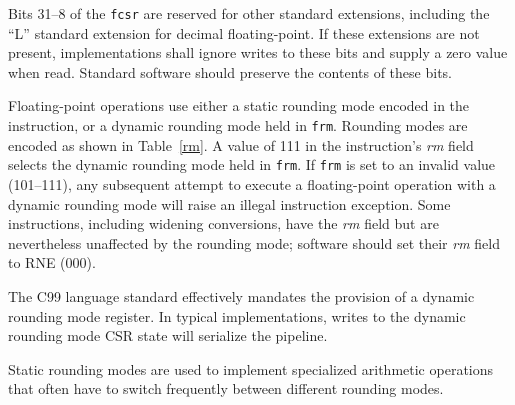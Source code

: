 Bits 31--8 of the {\tt fcsr} are reserved for other standard extensions,
including the ``L'' standard extension for decimal floating-point.  If
these extensions are not present, implementations shall ignore writes to
these bits and supply a zero value when read.  Standard software should
preserve the contents of these bits.

Floating-point operations use either a static rounding mode encoded in the
instruction, or a dynamic rounding mode held in {\tt frm}.  Rounding modes are
encoded as shown in Table~\ref{rm}.  A value of 111 in the instruction's {\em
rm} field selects the dynamic rounding mode held in {\tt frm}.  If {\tt frm}
is set to an invalid value (101--111), any subsequent attempt to execute
a floating-point operation with a dynamic rounding mode will raise an illegal
instruction exception.  Some instructions, including widening conversions,
have the {\em rm} field but are nevertheless unaffected by the rounding mode;
software should set their {\em rm} field to RNE (000).

\begin{commentary}
The C99 language standard effectively mandates the provision of a
dynamic rounding mode register.  In typical implementations, writes to
the dynamic rounding mode CSR state will serialize the pipeline.

Static rounding modes are used to implement specialized arithmetic
operations that often have to switch frequently between different
rounding modes.
\end{commentary}
\newpage
 
